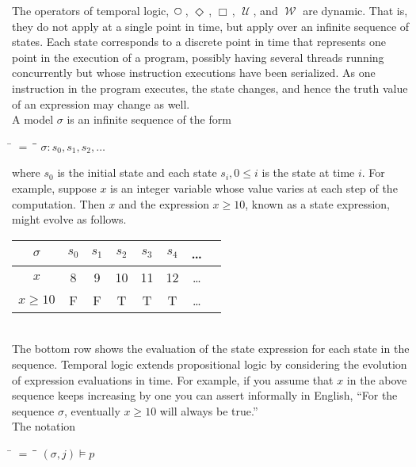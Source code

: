 \documentclass[fleqn, leqno]{article}
\newcommand{\mymathindent}{24pt}                    %
\newcommand{\Until}{\;\mathcal{U}\;}
\newcommand{\Wait}{\;\mathcal{W}\;}
\newcommand{\Next}{\;\,\text{\raisebox{3.5pt}{\circle{6}}}}
\newcommand{\Event}{\Diamond\,}
\newcommand{\Always}{\Box\,}
\newcommand{\myqedtab}{\hspace{388.5pt}}              %
\begin{document}
The operators of temporal logic, $\Next$, $\Event$, $\Always$, $\Until$, and $\Wait$ are dynamic.
That is, they do not apply at a single point in time, but apply over an infinite sequence of states.
Each state corresponds to a discrete point in time that represents one point in the execution of a program,
possibly having several threads running concurrently but whose instruction executions have been serialized.
As one instruction in the program executes, the state changes, and hence the truth value of an expression may change as well.\\

A model $\sigma$ is an infinite sequence of the form

\begin{tabbing}
\hspace{\mymathindent} \= $= \;$ \= \myqedtab \= \kill
  \> $\sigma: s_0, s_1, s_2, \dots$
\end{tabbing}

where $s_0$ is the initial state and each state $s_i, 0 \le i$ is the state at time $i$.
For example, suppose $x$ is an integer variable whose value varies at each step of the computation.
Then $x$ and the expression $x\ge 10$, known as a state expression, might evolve as follows.\\

\begin{tabular}{c|ccccccc}
  $\sigma$      & $s_0$ & $s_1$ & $s_2$ & $s_3$ & $s_4$ & \dots \\
  \hline
  $x$           & 8     & 9     & 10    & 11    & 12    & \dots\\
  $x\ge 10$     & F     & F     & T     & T     & T     & \dots
\end{tabular}\\

The bottom row shows the evaluation of the state expression for each state in the sequence.
Temporal logic extends propositional logic by considering the evolution of expression evaluations in time.
For example, if you assume that $x$ in the above sequence keeps increasing by one you can assert
informally in English, ``For the sequence $\sigma$, eventually $x\ge 10$ will always be true.''\\

The notation

\begin{tabbing}
\hspace{\mymathindent} \= $= \;$ \= \myqedtab \= \kill
  \> $(\sigma, j) \models p$
\end{tabbing}
\end{document}
